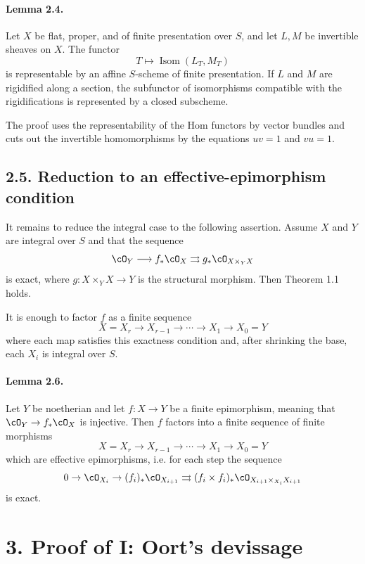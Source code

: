 \documentclass[11pt]{article}
\theoremstyle{plain}
\theoremstyle{definition}
\theoremstyle{remark}
\DeclareMathOperator{\Isom}{Isom}
\newcommand{\longto}{\longrightarrow}
\begin{document}
\paragraph{Lemma 2.4.}
Let $X$ be flat, proper, and of finite presentation over $S$, and let $L,M$ be invertible sheaves on $X$. The functor
\[
T\longmapsto \Isom(L_T,M_T)
\]
is representable by an affine $S$-scheme of finite presentation. If $L$ and $M$ are rigidified along a section, the subfunctor of isomorphisms compatible with the rigidifications is represented by a closed subscheme.

The proof uses the representability of the Hom functors by vector bundles and cuts out the invertible homomorphisms by the equations $uv=1$ and $vu=1$.

\subsection*{2.5. Reduction to an effective-epimorphism condition}

It remains to reduce the integral case to the following assertion. Assume $X$ and $Y$ are integral over $S$ and that the sequence
\[
\cO_Y\longto f_*\cO_X\rightrightarrows g_*\cO_{X\times_YX}
\]
is exact, where $g:X\times_YX\to Y$ is the structural morphism. Then Theorem 1.1 holds.

It is enough to factor $f$ as a finite sequence
\[
X=X_r\to X_{r-1}\to\cdots\to X_1\to X_0=Y
\]
where each map satisfies this exactness condition and, after shrinking the base, each $X_i$ is integral over $S$.

\paragraph{Lemma 2.6.}
Let $Y$ be noetherian and let $f:X\to Y$ be a finite epimorphism, meaning that $\cO_Y\to f_*\cO_X$ is injective. Then $f$ factors into a finite sequence of finite morphisms
\[
X=X_r\to X_{r-1}\to\cdots\to X_1\to X_0=Y
\]
which are effective epimorphisms, i.e. for each step the sequence
\[
0\to\cO_{X_i}\to (f_i)_*\cO_{X_{i+1}}
\rightrightarrows
(f_i\times f_i)_*\cO_{X_{i+1}\times_{X_i}X_{i+1}}
\]
is exact.

\section*{3. Proof of I: Oort's devissage}
\end{document}
